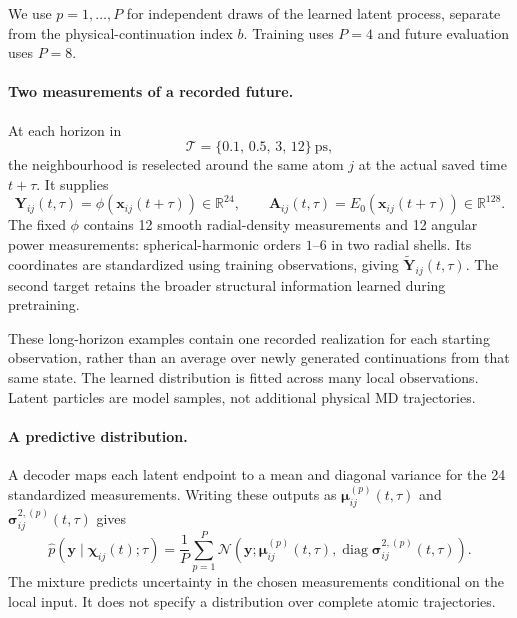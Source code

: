 \documentclass[11pt,a4paper]{article}
\newcommand{\R}{\mathbb R}
\newcommand{\x}{\mathbf x}
\begin{document}
We use $p=1,\ldots,P$ for independent draws of the learned latent process,
separate from the physical-continuation index $b$. Training uses $P=4$ and
future evaluation uses $P=8$.

\paragraph{Two measurements of a recorded future.}
At each horizon in
\[
\mathcal T=\{0.1,\,0.5,\,3,\,12\}\ \mathrm{ps},
\]
the neighbourhood is reselected around the same atom $j$ at the actual saved
time $t+\tau$. It supplies
\begin{equation}
\mathbf Y_{ij}(t,\tau)=\phi(\x_{ij}(t+\tau))\in\R^{24},
\qquad
\mathbf A_{ij}(t,\tau)=E_0(\x_{ij}(t+\tau))\in\R^{128}.
\label{eq:long-targets}
\end{equation}
The fixed $\phi$ contains 12 smooth radial-density measurements and 12 angular
power measurements: spherical-harmonic orders $1$--$6$ in two radial shells.
Its coordinates are standardized using training observations, giving
$\widetilde{\mathbf Y}_{ij}(t,\tau)$. The second target retains the broader
structural information learned during pretraining.

These long-horizon examples contain one recorded realization for each starting
observation, rather than an average over newly generated continuations from that
same state. The learned distribution is fitted across many local observations.
Latent particles are model samples, not additional physical MD trajectories.

\paragraph{A predictive distribution.}
A decoder maps each latent endpoint to a mean and diagonal variance for the 24
standardized measurements. Writing these outputs as
$\boldsymbol\mu_{ij}^{(p)}(t,\tau)$ and
$\boldsymbol\sigma_{ij}^{2,(p)}(t,\tau)$ gives
\begin{equation}
\boxed{
\widehat p(\mathbf y\mid\boldsymbol\chi_{ij}(t);\tau)
=\frac1P\sum_{p=1}^{P}
\mathcal N\!\left(\mathbf y;
\boldsymbol\mu_{ij}^{(p)}(t,\tau),
\operatorname{diag}\boldsymbol\sigma_{ij}^{2,(p)}(t,\tau)\right).
}
\label{eq:mixture}
\end{equation}
The mixture predicts uncertainty in the chosen measurements conditional on the
local input. It does not specify a distribution over complete atomic trajectories.
\end{document}
